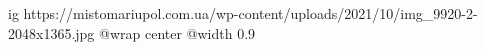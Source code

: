  
 
 
 
 

\ifcmt
  ig https://mistomariupol.com.ua/wp-content/uploads/2021/10/img_9920-2-2048x1365.jpg
  @wrap center
  @width 0.9
\fi
